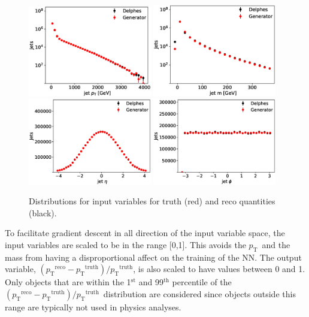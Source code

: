 \documentclass[showpacs,showkeys,preprint,prd,nofootinbib,linenumbers,12pt,superscriptaddress]{revtex4-1}
\def\pt{\ensuremath{p_{\mathrm{T}}}}
\def\ptRes{\ensuremath{(\pt^{\mathrm{reco}}-\pt^{\mathrm{truth}})/\pt^{\mathrm{truth}}}}
\begin{document}
\begin{figure}[h]
  \includegraphics[width=0.48\textwidth]{figures/nn/jet_pT_prescaling_log.eps}
  \includegraphics[width=0.48\textwidth]{figures/nn/jet_m_prescaling_log.eps}\\
  \includegraphics[width=0.48\textwidth]{figures/nn/jet_eta_prescaling.eps}
  \includegraphics[width=0.48\textwidth]{figures/nn/jet_phi_prescaling.eps}
  \caption{Distributions for input variables for truth (red) and reco quantities (black).}
  \label{fig:nnInputsPrescaling}
\end{figure}

To facilitate gradient descent in all direction of the input variable space, the input variables are scaled to be in the range [0,1]. This avoids the \pt\ and the mass from having a disproportional affect on the training of the NN. The output variable, \ptRes, is also scaled to have values between 0 and 1. Only objects that 
are within the 1$^{\mathrm{st}}$ and 99$^{\mathrm{th}}$ percentile of the \ptRes\ distribution are considered since objects outside this range are typically not used in physics analyses.
\end{document}
